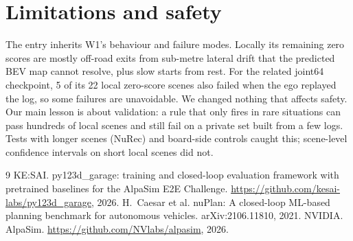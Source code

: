 \documentclass{article}
\begin{document}
\section{Limitations and safety}
The entry inherits W1's behaviour and failure modes. Locally its remaining zero scores are mostly off-road exits from
sub-metre lateral drift that the predicted BEV map cannot resolve, plus slow starts from rest. For the
related joint64 checkpoint, 5 of its 22 local zero-score scenes also failed when the ego replayed the log, so some
failures are unavoidable. We changed nothing that
affects safety. Our main lesson is about validation: a rule that only fires in rare situations can pass hundreds of
local scenes and still fail on a private set built from a few logs. Tests with longer scenes (NuRec) and
board-side controls caught this; scene-level confidence intervals on short local scenes did not.

\begin{thebibliography}{9}
 KE:SAI. \newblock py123d\_garage: training and closed-loop evaluation framework with pretrained
  baselines for the AlpaSim E2E Challenge. \newblock \url{https://github.com/kesai-labs/py123d_garage}, 2026.
 H.~Caesar et al. \newblock nuPlan: A closed-loop ML-based planning benchmark for autonomous vehicles.
  \newblock arXiv:2106.11810, 2021.
 NVIDIA. \newblock AlpaSim. \newblock \url{https://github.com/NVlabs/alpasim}, 2026.
\end{thebibliography}
\end{document}

